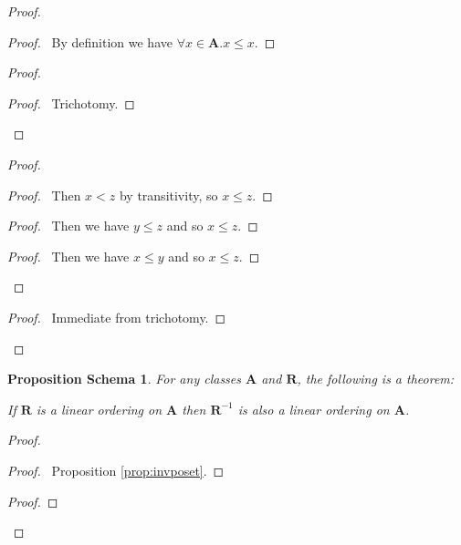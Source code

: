 \documentclass{book}
\let\qed\relax
\newtheorem{props}[ax]{Proposition Schema}
\theoremstyle{definition}
\begin{document}
\begin{proof}
\pf
{}
\begin{proof}
	\pf\ By definition we have $\forall x \in \mathbf{A}. x \leq x$.
\end{proof}
\begin{proof}
	\begin{proof}
		\pf\ Trichotomy.
	\end{proof}
\end{proof}
\begin{proof}
	\begin{proof}
		\pf\ Then $x < z$ by transitivity, so $x \leq z$.
	\end{proof}
	\begin{proof}
		\pf\ Then we have $y \leq z$ and so $x \leq z$.
	\end{proof}
	\begin{proof}
		\pf\ Then we have $x \leq y$ and so $x \leq z$.
	\end{proof}
\end{proof}
\begin{proof}
	\pf\ Immediate from trichotomy.
\end{proof}
\qed
\end{proof}

\begin{props}
For any classes $\mathbf{A}$ and $\mathbf{R}$, the following is a theorem:

If $\mathbf{R}$ is a linear ordering on $\mathbf{A}$ then $\mathbf{R}^{-1}$ is also a linear ordering on $\mathbf{A}$.
\end{props}

\begin{proof}
\pf
{}
\begin{proof}
	\pf\ Proposition \ref{prop:invposet}.
\end{proof}
\begin{proof}
\end{proof}
\qed
\end{proof}
\end{document}
